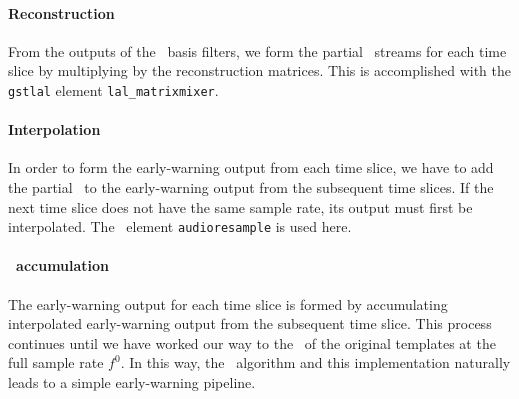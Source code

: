 \paragraph{Reconstruction}

From the outputs of the \SVD\ basis filters, we form the partial \SNR\ streams
for each time  slice by multiplying by the reconstruction matrices.  This is
accomplished with the \texttt{gstlal} element \texttt{lal\_matrixmixer}.

\paragraph{Interpolation}

In order to form the early-warning output from each time slice, we have to add
the partial \SNR\ to the early-warning output from the subsequent time slices.
If the next time slice does not have the same sample rate, its output must
first be interpolated.  The \gstreamer\ element {\tt audioresample} is used here.  

\paragraph{\SNR\ accumulation}

The early-warning output for each time slice is formed by accumulating
interpolated early-warning output from the subsequent time slice.  This process
continues until we have worked our way to the \SNR\ of the original templates
at the full sample rate $f^0$.  In this way, the \lloid\ algorithm and this
implementation naturally leads to a simple early-warning pipeline.
